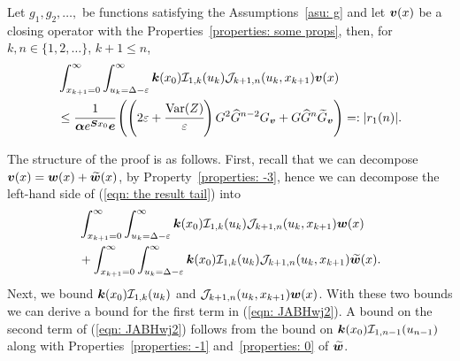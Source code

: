 \begin{cor}\label{cor: lh and rh}
	Let \(g_1, g_2, \dots,\) be functions satisfying the Assumptions~\ref{asu: g} and let \(\boldsymbol v(x)\) be a closing operator with the Properties~\ref{properties: some props}, then, for \(k,n \in \{1,2,\dots\}\), \(k+1\leq n\),
	\begin{align}
		&\int_{x_{k+1}=0}^\infty \int_{u_k=\Delta-\varepsilon}^\infty \boldsymbol k(x_0)\mathcal I_{1,k}(u_k) \mathcal J_{k+1,n}(u_k,x_{k+1})\boldsymbol v(x) \nonumber
            	\\&\leq \cfrac{1}{\boldsymbol \alpha e^{\boldsymbol{S}x_0}\boldsymbol e}\left(\left(2\varepsilon + \cfrac{\mathrm{Var}(Z)}{\varepsilon}\right) G^2 \widehat G^{n-2} G_{\boldsymbol v} + G\widehat G^{n}\widetilde G_{\boldsymbol v}\right)  =: |r_1(n)|. \label{eqn: the result tail}
	\end{align}
\end{cor}
The structure of the proof is as follows. First, recall that we can decompose \(\boldsymbol v(x)=\boldsymbol w(x)+\widetilde{\boldsymbol{w}}(x)\), by Property~\ref{properties: -3}, hence we can decompose the left-hand side of (\ref{eqn: the result tail}) into 
\begin{align}
	&\int_{x_{k+1}=0}^\infty \int_{u_k=\Delta-\varepsilon}^\infty \boldsymbol k(x_0)\mathcal I_{1,k}(u_k) \mathcal J_{k+1,n}(u_k,x_{k+1})\boldsymbol w(x) \nonumber 
	\\&{}+ \int_{x_{k+1}=0}^\infty \int_{u_k=\Delta-\varepsilon}^\infty \boldsymbol k(x_0)\mathcal I_{1,k}(u_k) \mathcal J_{k+1,n}(u_k,x_{k+1})\widetilde{\boldsymbol w}(x). \label{eqn: JABHwj2}
\end{align} 
Next, we bound \(\boldsymbol k(x_0)\mathcal I_{1,k}(u_k) \) and \(\mathcal J_{k+1,n}(u_k,x_{k+1})  {\boldsymbol w}(x)\). With these two bounds we can derive a bound for the first term in (\ref{eqn: JABHwj2}). A bound on the second term of (\ref{eqn: JABHwj2}) follows from the bound on \(\boldsymbol k(x_0)\mathcal I_{1,n-1}(u_{n-1})\) along with Properties~\ref{properties: -1} and~\ref{properties: 0} of \(\widetilde{\boldsymbol w}\).

